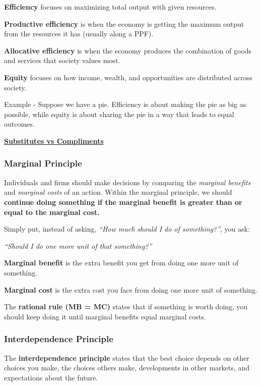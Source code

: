 \textbf{Efficiency} focuses on maximizing total output with given resources.

\textbf{Productive efficiency} is when the economy is getting the maximum output from the resources it has (usually along a PPF).

\textbf{Allocative efficiency} is when the economy produces the combination of goods and services that society values most.

\textbf{Equity} focuses on how income, wealth, and opportunities are distributed across society.

Example - Suppose we have a pie. Efficiency is about making the pie as big as possible, while equity is about sharing the pie in a way that leads to equal outcomes.

\underline{\textbf{Substitutes vs Compliments}}


\subsubsection{Marginal Principle}

Individuals and firms should make decisions by comparing the \textit{marginal benefits} and \textit{marginal costs} of an action. Within the marginal principle, we should \textbf{continue doing something if the marginal benefit is greater than or equal to the marginal cost.}

Simply put, instead of asking, \textit{``How much should I do of something?''}, you ask:

\textit{``Should I do one more unit of that something?''}

\textbf{Marginal benefit} is the extra benefit you get from doing one more unit of something.

\textbf{Marginal cost} is the extra cost you face from doing one more unit of something.

The \textbf{rational rule (MB = MC)} states that if something is worth doing, you should keep doing it until marginal benefits equal marginal costs.



\subsubsection{Interdependence Principle}

The \textbf{interdependence principle} states that the best choice depends on other choices you make, the choices others make, developments in other markets, and expectations about the future.

